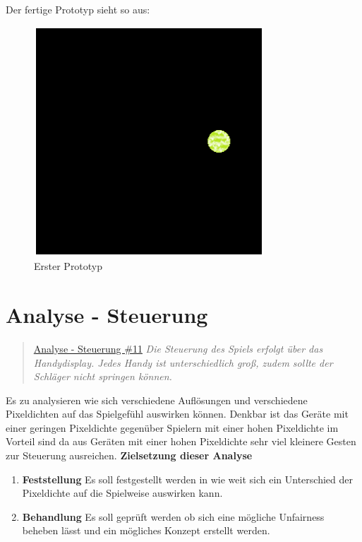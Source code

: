 \newpage
Der fertige Prototyp sieht so aus:
\begin{figure}[ht]
	\includegraphics[scale=1]{frontend/prototype-0.png}
	\centering
	\caption{Erster Prototyp}
	\label{figx}
\end{figure}
\newpage
\section{Analyse - Steuerung}
\begin{quote}
	\href{https://github.com/Transport-Protocol/MBC-Ping-Pong/issues/11}{Analyse - Steuerung \#11}
	\newline
	\textit{Die Steuerung des Spiels erfolgt über das Handydisplay. Jedes Handy ist unterschiedlich groß, zudem sollte der Schläger nicht springen können.}
\end{quote}
Es zu analysieren wie sich verschiedene Auflösungen und verschiedene Pixeldichten auf das Spielgefühl auswirken können.
Denkbar ist das Geräte mit einer geringen Pixeldichte gegenüber Spielern mit einer hohen Pixeldichte im Vorteil sind da aus Geräten mit einer hohen Pixeldichte sehr viel kleinere Gesten zur Steuerung ausreichen.
\newline
\textbf{Zielsetzung dieser Analyse}
\begin{enumerate}
	\item
	      \textbf{Feststellung} Es soll festgestellt werden in wie weit sich ein Unterschied der Pixeldichte auf die Spielweise auswirken kann.
	\item
	      \textbf{Behandlung} Es soll geprüft werden ob sich eine mögliche Unfairness beheben lässt und ein mögliches Konzept erstellt werden.
\end{enumerate}
